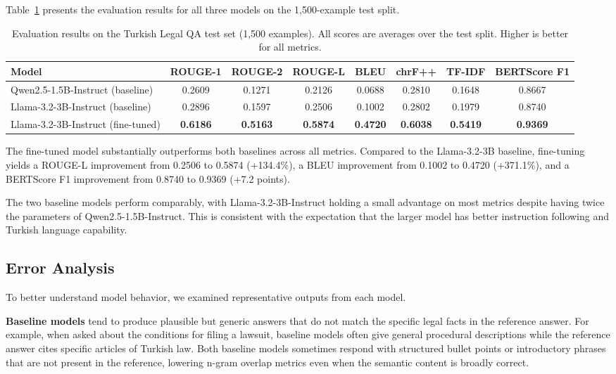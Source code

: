 \documentclass[conference]{IEEEtran}
\begin{document}
Table~\ref{tab:results} presents the evaluation results for all three models on the
1,500-example test split.

\begin{table}[t]
\centering
\caption{Evaluation results on the Turkish Legal QA test set (1,500 examples).
All scores are averages over the test split. Higher is better for all metrics.}
\label{tab:results}
\begin{tabular}{lccccccc}
\toprule
\textbf{Model} & \textbf{ROUGE-1} & \textbf{ROUGE-2} & \textbf{ROUGE-L} &
\textbf{BLEU} & \textbf{chrF++} & \textbf{TF-IDF} & \textbf{BERTScore F1} \\
\midrule
Qwen2.5-1.5B-Instruct (baseline)     & 0.2609 & 0.1271 & 0.2126 & 0.0688 & 0.2810 & 0.1648 & 0.8667 \\
Llama-3.2-3B-Instruct (baseline)     & 0.2896 & 0.1597 & 0.2506 & 0.1002 & 0.2802 & 0.1979 & 0.8740 \\
Llama-3.2-3B-Instruct (fine-tuned)   & \textbf{0.6186} & \textbf{0.5163} & \textbf{0.5874} & \textbf{0.4720} & \textbf{0.6038} & \textbf{0.5419} & \textbf{0.9369} \\
\bottomrule
\end{tabular}
\end{table}

The fine-tuned model substantially outperforms both baselines across all metrics. Compared
to the Llama-3.2-3B baseline, fine-tuning yields a ROUGE-L improvement from 0.2506 to
0.5874 (+134.4\%), a BLEU improvement from 0.1002 to 0.4720 (+371.1\%), and a BERTScore
F1 improvement from 0.8740 to 0.9369 (+7.2 points).

The two baseline models perform comparably, with Llama-3.2-3B-Instruct holding a small
advantage on most metrics despite having twice the parameters of Qwen2.5-1.5B-Instruct.
This is consistent with the expectation that the larger model has better instruction
following and Turkish language capability.

\subsection{Error Analysis}

To better understand model behavior, we examined representative outputs from each model.

\textbf{Baseline models} tend to produce plausible but generic answers that do not match
the specific legal facts in the reference answer. For example, when asked about the
conditions for filing a lawsuit, baseline models often give general procedural descriptions
while the reference answer cites specific articles of Turkish law. Both baseline models
sometimes respond with structured bullet points or introductory phrases that are not present
in the reference, lowering n-gram overlap metrics even when the semantic content is broadly
correct.
\end{document}
